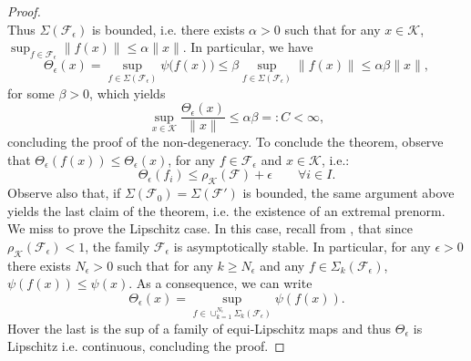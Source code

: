 \documentclass[10pt,a4paper]{amsart}
\newcommand{\cone}{\mathcal{K}}
\newcommand{\cradius}{\rho_{\cone}}
\newcommand{\family}{\mathcal{F}}
\begin{document}
\begin{proof}
\begin{equation}
        \end{equation}
        Thus $\Sigma(\family_\epsilon)$ is bounded, i.e. there exists $\alpha>0$ such that for any $x\in\cone$, $\sup_{f\in\family_{\epsilon}}\|f(x)\|\leq \alpha\|x\|$. In particular, we have 
        \begin{equation}
            \Theta_{\epsilon}(x)=\sup_{f\in \Sigma(\family_\epsilon)}\psi\big(f(x)\big)\leq \beta \sup_{f\in \Sigma(\family_\epsilon)}\|f(x)\|\leq \alpha \beta \|x\|,
        \end{equation}
        for some $\beta>0$, which yields 
        \begin{equation}
            \sup_{x\in\cone}\frac{\Theta_{\epsilon}(x)}{\|x\|}\leq \alpha\beta=:C<\infty,
        \end{equation}
        concluding the proof of the non-degeneracy.
        To conclude the theorem, observe that $
            \Theta_{\epsilon}(f(x))\leq \Theta_{\epsilon}(x)$, for any $f\in \family_{\epsilon}$ and $x\in\cone$, i.e.:
            \begin{equation}
                \Theta_\epsilon(f_i) \leq \cradius(\family)+\epsilon \qquad \forall i\in I.
            \end{equation}
          Observe also that, if $\Sigma(\family_0)=\Sigma(\family')$ is bounded, the same argument above yields the last claim of the theorem, i.e. the existence of an extremal prenorm.
          We miss to prove the Lipschitz case. In this case, recall from , that since $\cradius(\family_\epsilon)<1$, the family $\family_\epsilon$ is asymptotically stable. In particular, for any $\epsilon>0$ there exists $N_\epsilon>0$ such that for any $k\geq N_\epsilon$ and any $f\in \Sigma_k(\family_\epsilon)$, $\psi(f(x))\leq \psi(x)$. As a consequence, we can write 
          \begin{equation}
            \Theta_{\epsilon}(x)=\sup_{f\in \cup_{k=1}^{N_\epsilon}\Sigma_k(\family_{\epsilon})}\psi(f(x)).
        \end{equation}
          Hover the last is the sup of a family of equi-Lipschitz maps and thus $\Theta_\epsilon$ is Lipschitz i.e. continuous, concluding the proof.          
    \end{proof}
\end{document}
